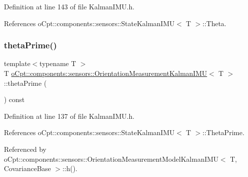 Definition at line 143 of file Kalman\+I\+M\+U.\+h.



References o\+Cpt\+::components\+::sensors\+::\+State\+Kalman\+I\+M\+U$<$ T $>$\+::\+Theta.

\hypertarget{classo_cpt_1_1components_1_1sensors_1_1_orientation_measurement_kalman_i_m_u_a57d5317eec50b4027ca91682a348d301}{}\label{classo_cpt_1_1components_1_1sensors_1_1_orientation_measurement_kalman_i_m_u_a57d5317eec50b4027ca91682a348d301} 
\subsubsection{\texorpdfstring{theta\+Prime()}{thetaPrime()}\hspace{0.1cm}{\footnotesize\ttfamily [1/2]}}
{\footnotesize\ttfamily template$<$typename T $>$ \\
T \hyperlink{classo_cpt_1_1components_1_1sensors_1_1_orientation_measurement_kalman_i_m_u}{o\+Cpt\+::components\+::sensors\+::\+Orientation\+Measurement\+Kalman\+I\+MU}$<$ T $>$\+::theta\+Prime (\begin{DoxyParamCaption}{ }\end{DoxyParamCaption}) const\hspace{0.3cm}{\ttfamily [inline]}}



Definition at line 137 of file Kalman\+I\+M\+U.\+h.



References o\+Cpt\+::components\+::sensors\+::\+State\+Kalman\+I\+M\+U$<$ T $>$\+::\+Theta\+Prime.



Referenced by o\+Cpt\+::components\+::sensors\+::\+Orientation\+Measurement\+Model\+Kalman\+I\+M\+U$<$ T, Covariance\+Base $>$\+::h().

